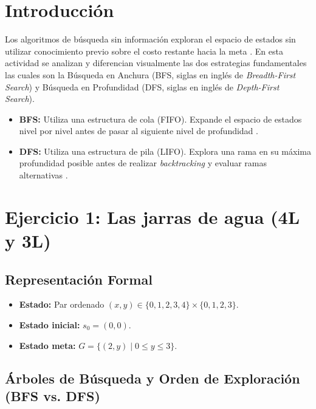 \documentclass[11pt,letterpaper]{article}
\begin{document}
\portada
\indicegeneral

\section{Introducción}

Los algoritmos de búsqueda sin información exploran el espacio de estados sin utilizar conocimiento previo sobre el costo restante hacia la meta \parencite{iae_u2_diseno}. En esta actividad se analizan y diferencian visualmente las dos estrategias fundamentales las cuales son la Búsqueda en Anchura (BFS, siglas en inglés de \textit{Breadth-First Search}) y Búsqueda en Profundidad (DFS, siglas en inglés de \textit{Depth-First Search}).

\begin{itemize}
  \item \textbf{BFS:} Utiliza una estructura de cola (FIFO). Expande el espacio de estados nivel por nivel antes de pasar al siguiente nivel de profundidad \parencite{iae_u2_diseno}.
  \item \textbf{DFS:} Utiliza una estructura de pila (LIFO). Explora una rama en su máxima profundidad posible antes de realizar \textit{backtracking} y evaluar ramas alternativas \parencite{iae_u2_diseno}.
\end{itemize}

\section{Ejercicio 1: Las jarras de agua (4L y 3L)}

\subsection{Representación Formal}
\begin{itemize}
  \item \textbf{Estado:} Par ordenado $(x,y) \in \{0,1,2,3,4\} \times \{0,1,2,3\}$.
  \item \textbf{Estado inicial:} $s_0 = (0,0)$.
  \item \textbf{Estado meta:} $G = \{(2,y) \mid 0 \le y \le 3\}$.
\end{itemize}

\subsection{Árboles de Búsqueda y Orden de Exploración (BFS vs. DFS)}
\end{document}

